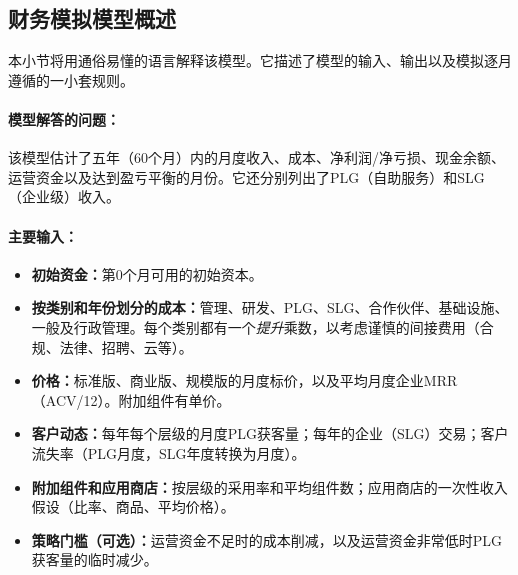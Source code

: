 \documentclass[11pt, a4paper, oneside]{article}
\begin{document}
\subsection{财务模拟模型概述}
\label{subsec:simple-model}

本小节将用通俗易懂的语言解释该模型。它描述了模型的输入、输出以及模拟逐月遵循的一小套规则。

\paragraph{模型解答的问题：}
该模型估计了五年（60个月）内的月度收入、成本、净利润/净亏损、现金余额、运营资金以及达到盈亏平衡的月份。它还分别列出了PLG（自助服务）和SLG（企业级）收入。

\paragraph{主要输入：}
\begin{itemize}
\item \textbf{初始资金：}第0个月可用的初始资本。
\item \textbf{按类别和年份划分的成本：}管理、研发、PLG、SLG、合作伙伴、基础设施、一般及行政管理。每个类别都有一个\emph{提升}乘数，以考虑谨慎的间接费用（合规、法律、招聘、云等）。
\item \textbf{价格：}标准版、商业版、规模版的月度标价，以及平均月度企业MRR（ACV/12）。附加组件有单价。
\item \textbf{客户动态：}每年每个层级的月度PLG获客量；每年的企业（SLG）交易；客户流失率（PLG月度，SLG年度转换为月度）。
\item \textbf{附加组件和应用商店：}按层级的采用率和平均组件数；应用商店的一次性收入假设（比率、商品、平均价格）。
\item \textbf{策略门槛（可选）：}运营资金不足时的成本削减，以及运营资金非常低时PLG获客量的临时减少。
\end{itemize}
\end{document}
